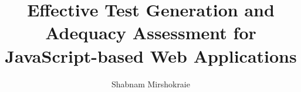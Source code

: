 \documentclass[gpscopy,onehalfspacing,11pt]{ubcdiss}
\title{Effective Test Generation and Adequacy Assessment for JavaScript-based Web Applications}
\author{Shabnam Mirshokraie}
\begin{document}

\maketitle


\cleardoublepage


\cleardoublepage

\tableofcontents
\cleardoublepage	%

\listoftables
\cleardoublepage	%

\listoffigures
\cleardoublepage	%



\textspacing		%




\mainmatter

\acresetall	%



%
%
%
%
%


\begin{singlespace}
\raggedright


\end{singlespace}

\appendix


\backmatter
\end{document}
